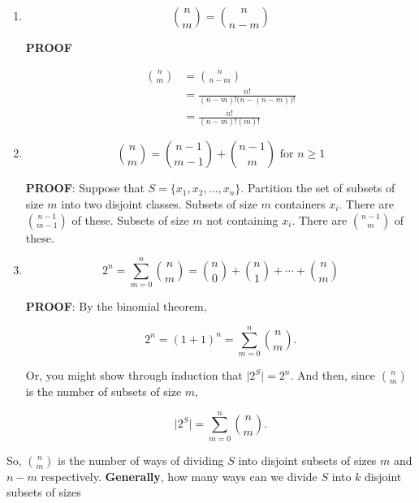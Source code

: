 \documentclass[12pt]{article}
\begin{document}
\begin{enumerate}[label=(\roman*)]
\item 

\begin{equation*}
{n \choose m} = {n \choose n-m}
\end{equation*}

\noindent
\textbf{PROOF}

\begin{align*}
{n \choose m} & = {n \choose n-m} \\
& = \frac{n!}{(n-m)! \big ( n-(n-m) \big )!} \\
& = \frac{n!}{(n-m)! (m)!}
\end{align*}

\item 

\begin{equation*}
{n \choose m} = {n-1 \choose m-1} + {n-1 \choose m} \text{ for } n \geq 1
\end{equation*}

\noindent
\textbf{PROOF}: Suppose that $S = \{ x_1, x_2, \ldots, x_n \}$. Partition the set of subsets of size $m$ into two disjoint classes. Subsets of size $m$ containers $x_i$. There are ${n-1 \choose m-1}$ of these. Subsets of size $m$ not containing $x_i$. There are ${n-1 \choose m}$ of these.

\item 

\begin{equation*}
2^n = \sum_{m=0}^{n} {n \choose m} = {n \choose 0} + {n \choose 1} + \cdots + {n \choose m}
\end{equation*}

\noindent
\textbf{PROOF}: By the binomial theorem, 

\begin{equation*}
2^n = (1+1)^n = \sum_{m=0}^{n} {n \choose m}.
\end{equation*}

\noindent
Or, you might show through induction that $\lvert 2^S \rvert = 2^n$. And then, since ${n \choose m}$ is the number of subsets of size $m$,

\begin{equation*}
\lvert 2^S \rvert = \sum_{m=0}^{n} {n \choose m}.
\end{equation*}
\end{enumerate}

\noindent
So, ${n \choose m}$ is the number of ways of dividing $S$ into disjoint subsets of sizes $m$ and $n-m$ respectively. \textbf{Generally}, how many ways can we divide $S$ into $k$ disjoint subsets of sizes
\end{document}
